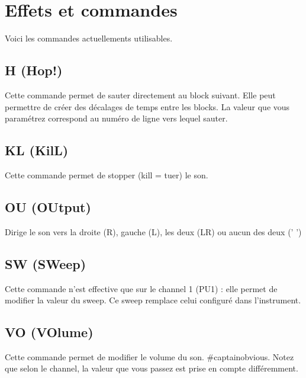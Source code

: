 \documentclass[12pt,a4paper]{article}
\begin{document}
    \newpage
    \section{Effets et commandes}
  

    Voici les commandes actuellements utilisables.

    \subsection{H (Hop!)}

    Cette commande permet de sauter directement au block suivant.
    Elle peut permettre de créer des décalages de temps entre les blocks.
    La valeur que vous paramétrez correspond au numéro de ligne vers lequel sauter.

    \subsection{KL (KilL)}

    Cette commande permet de stopper (kill = tuer) le son.


    \subsection{OU (OUtput)}

    Dirige le son vers la droite (R), gauche (L), les deux (LR) ou aucun des deux ('  ')

    \subsection{SW (SWeep)}

    Cette commande n'est effective que sur le channel 1 (PU1) : elle permet de modifier la valeur du sweep.
    Ce sweep remplace celui configuré dans l'instrument.

    \subsection{VO (VOlume)}

    Cette commande permet de modifier le volume du son.
    \#captainobvious.
    Notez que selon le channel, la valeur que vous passez est prise en compte différemment.
\end{document}
